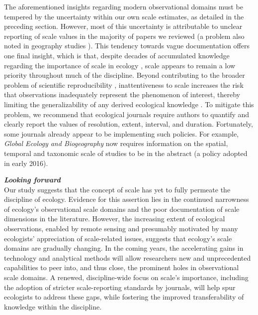 \documentclass[12pt]{article}
\begin{document}
The aforementioned insights regarding modern observational domains must be tempered by the uncertainty within our own scale estimates, as detailed in the preceding section. However, most of this uncertainty is attributable to unclear reporting of scale values in the majority of papers we reviewed (a problem also noted in geography studies \cite{margulies_ambiguous_2016}). This tendency towards vague documentation offers one final insight, which is that, despite decades of accumulated knowledge regarding the importance of scale in ecology \cite{levin_problem_1992, wiens_spatial_1989, chave_problem_2013, wheatley_factors_2009}, scale appears to remain a low priority throughout much of the discipline. Beyond contributing to the broader problem of scientific reproducibility \cite{baker_1500_2016}, inattentiveness to scale increases the risk that observations inadequately represent the phenomenon of interest, thereby limiting the generalizability of any derived ecological knowledge \cite{margulies_ambiguous_2016, wheatley_factors_2009, wiens_spatial_1989}. To mitigate this problem, we recommend that ecological journals require authors to quantify and clearly report the values of resolution, extent, interval, and duration. Fortunately, some journals already appear to be implementing such policies. For example, \emph{Global Ecology and Biogeography} now requires information on the spatial, temporal and taxonomic scale of studies to be in the abstract (a policy adopted in early 2016).

\vspace{5pt}
\noindent \textbf{\emph{Looking forward}}\\
Our study suggests that the concept of scale has yet to fully permeate the discipline of ecology. Evidence for this assertion lies in the continued narrowness of ecology's observational scale domains and the poor documentation of scale dimensions in the literature. However, the increasing extent of ecological observations, enabled by remote sensing and presumably motivated by many ecologists' appreciation of scale-related issues, suggests that ecology's scale domains are gradually changing. In the coming years, the accelerating gains in technology and analytical methods will allow researchers new and unprecedented capabilities to peer into, and thus close, the prominent holes in observational scale domains. A renewed, discipline-wide focus on scale's importance, including the adoption of stricter scale-reporting standards by journals, will help spur ecologists to address these gaps, while fostering the improved transferability of knowledge within the discipline.  
\end{document}
